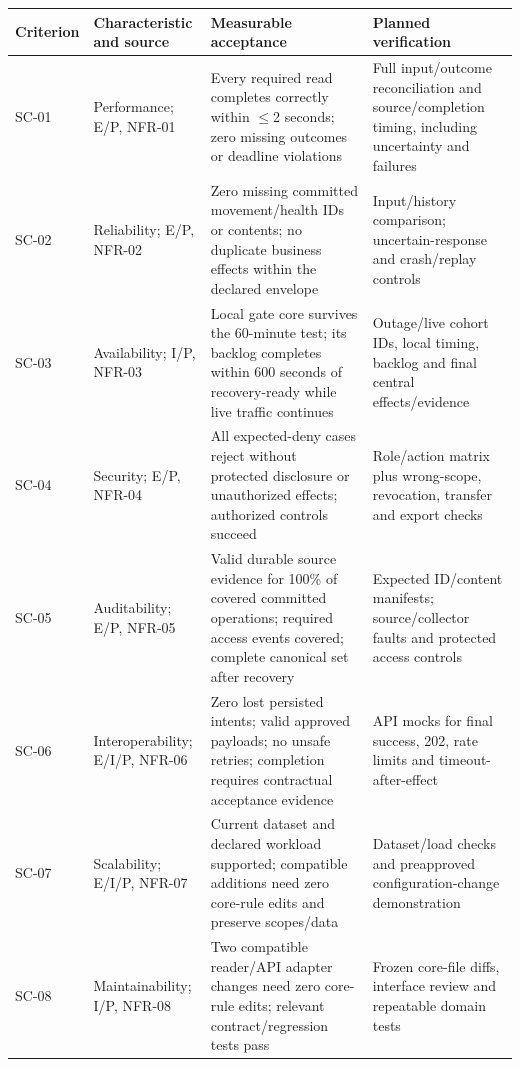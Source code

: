 {\small
\begin{longtable}[]{|>{\raggedright\arraybackslash}p{}|>{\raggedright\arraybackslash}p{}|>{\raggedright\arraybackslash}p{}|>{\raggedright\arraybackslash}p{}|}
\hline
\textbf{Criterion} & \textbf{Characteristic and source} & \textbf{Measurable acceptance} & \textbf{Planned verification} \\ \hline
\endhead
SC-01 & Performance; E/P, NFR-01 & Every required read completes
correctly within \(\leq\)2 seconds; zero missing outcomes or deadline
violations & Full input/outcome reconciliation and source/completion
timing, including uncertainty and failures \\ \hline
SC-02 & Reliability; E/P, NFR-02 & Zero missing committed
movement/health IDs or contents; no duplicate business effects within
the declared envelope & Input/history comparison; uncertain-response and
crash/replay controls \\ \hline
SC-03 & Availability; I/P, NFR-03 & Local gate core survives the
60-minute test; its backlog completes within 600 seconds of
recovery-ready while live traffic continues & Outage/live cohort IDs,
local timing, backlog and final central effects/evidence \\ \hline
SC-04 & Security; E/P, NFR-04 & All expected-deny cases reject without
protected disclosure or unauthorized effects; authorized controls
succeed & Role/action matrix plus wrong-scope, revocation, transfer and
export checks \\ \hline
SC-05 & Auditability; E/P, NFR-05 & Valid durable source evidence for
100\% of covered committed operations; required access events covered;
complete canonical set after recovery & Expected ID/content manifests;
source/collector faults and protected access controls \\ \hline
SC-06 & Interoperability; E/I/P, NFR-06 & Zero lost persisted intents;
valid approved payloads; no unsafe retries; completion requires
contractual acceptance evidence & API mocks for final success, 202, rate
limits and timeout-after-effect \\ \hline
SC-07 & Scalability; E/I/P, NFR-07 & Current dataset and declared
workload supported; compatible additions need zero core-rule edits and
preserve scopes/data & Dataset/load checks and preapproved
configuration-change demonstration \\ \hline
SC-08 & Maintainability; I/P, NFR-08 & Two compatible reader/API adapter
changes need zero core-rule edits; relevant contract/regression tests
pass & Frozen core-file diffs, interface review and repeatable domain
tests \\ \hline
\end{longtable}
}

